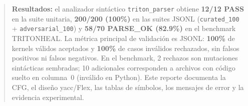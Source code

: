 \documentclass[11pt,a4paper]{article}
\begin{document}


\begin{abstract}
\noindent
\textbf{Resultados:} el analizador sintáctico \texttt{triton\_parser} obtiene \textbf{12/12 PASS} en la suite unitaria, \textbf{200/200 (100\%)} en las suites JSONL (\texttt{curated\_100} + \texttt{adversarial\_100}) y \textbf{58/70 PARSE\_OK (82.9\%)} en el benchmark TRITONHEAL. La métrica principal de validación es JSONL: \textbf{100\%} de kernels válidos aceptados y \textbf{100\%} de casos inválidos rechazados, sin falsos positivos ni falsos negativos. En el benchmark, 2 rechazos son mutaciones sintácticas sembradas; 10 adicionales corresponden a archivos con código suelto en columna~0 (inválido en Python). Este reporte documenta la CFG, el diseño yacc/Flex, las tablas de símbolos, los mensajes de error y la evidencia experimental.
\end{abstract}

\tableofcontents
\listoffigures
\listoftables
\newpage
{}
\setcounter{page}{1}









\end{document}

